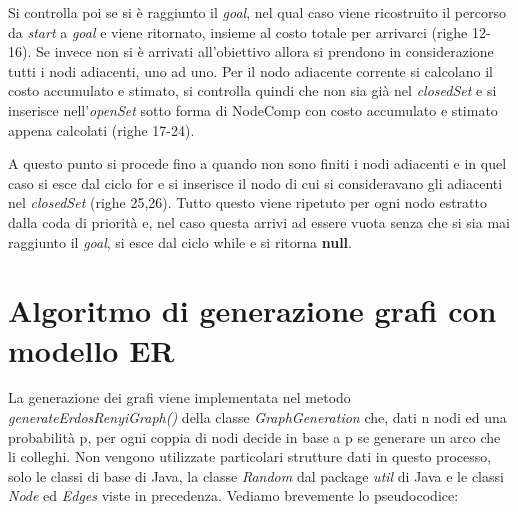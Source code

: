 \documentclass[12pt,a4paper]{report}
\begin{document}
Si controlla poi se si è raggiunto il \textit{goal}, nel qual caso viene ricostruito il percorso da \textit{start} a \textit{goal} e viene ritornato, insieme al costo totale per arrivarci (righe 12-16).
Se invece non si è arrivati all'obiettivo allora si prendono in considerazione tutti i nodi adiacenti, uno ad uno. Per il nodo adiacente corrente si calcolano il costo accumulato e stimato, si controlla quindi che non sia già nel \textit{closedSet} e si inserisce nell'\textit{openSet} sotto forma di NodeComp con costo accumulato e stimato appena calcolati (righe 17-24).

A questo punto si procede fino a quando non sono finiti i nodi adiacenti e in quel caso si esce dal ciclo for e si inserisce il nodo di cui si consideravano gli adiacenti nel \textit{closedSet} (righe 25,26).
Tutto questo viene ripetuto per ogni nodo estratto dalla coda di priorità e, nel caso questa arrivi ad essere vuota senza che si sia mai raggiunto il \textit{goal}, si esce dal ciclo while e si ritorna \textbf{null}.

\section{Algoritmo di generazione grafi con modello ER}\label{se:gen-modello-ER}

La generazione dei grafi viene implementata nel metodo \textit{generateErdosRenyiGraph()} della classe \textit{GraphGeneration} che, dati n nodi ed una probabilità p, per ogni coppia di nodi decide in base a p se generare un arco che li colleghi.
Non vengono utilizzate particolari strutture dati in questo processo, solo le classi di base di Java, la classe \textit{Random} dal package \textit{util} di Java e le classi \textit{Node} ed \textit{Edges} viste in precedenza.
Vediamo brevemente lo pseudocodice:
\end{document}
